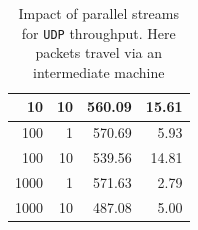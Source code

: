 \documentclass[12pt,a4paper,twoside,openright]{report}
\begin{document}
\begin{table}[H]
\begin{tabular}{|r|r|r|r|}
10                                                                                               & 10                                                                                          & 560.09                                                                                                                                       & 15.61                                                                                               \\ \hline
100                                                                                              & 1                                                                                           & 570.69                                                                                                                                       & 5.93                                                                                                \\ \hline
100                                                                                              & 10                                                                                          & 539.56                                                                                                                                       & 14.81                                                                                               \\ \hline
1000                                                                                             & 1                                                                                           & 571.63                                                                                                                                       & 2.79                                                                                                \\ \hline
1000                                                                                             & 10                                                                                          & 487.08                                                                                                                                       & 5.00                                                                                                \\ \hline
\end{tabular}
    \centering
    \caption{Impact of parallel streams for \texttt{UDP} throughput. Here packets travel via an intermediate machine}
    \label{fig:UDP_throughput_via_B_using_parallel_streams}
\end{table}
\end{document}
